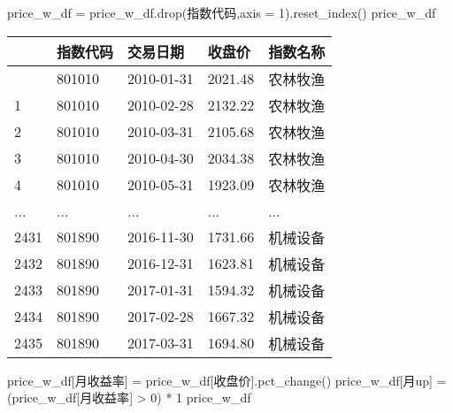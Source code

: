 \documentclass[
  letterpaper,
  DIV=11,
  numbers=noendperiod]{scrreprt}
\newenvironment{Shaded}{\begin{snugshade}}{\end{snugshade}}
\newcommand{\DecValTok}[1]{\textcolor[rgb]{0.68,0.00,0.00}{#1}}
\newcommand{\NormalTok}[1]{\textcolor[rgb]{0.00,0.23,0.31}{#1}}
\newcommand{\OperatorTok}[1]{\textcolor[rgb]{0.37,0.37,0.37}{#1}}
\newcommand{\StringTok}[1]{\textcolor[rgb]{0.13,0.47,0.30}{#1}}
\begin{document}
\begin{Shaded}
\begin{Highlighting}[]
\NormalTok{price\_w\_df }\OperatorTok{=}\NormalTok{ price\_w\_df.drop(}\StringTok{\textquotesingle{}指数代码\textquotesingle{}}\NormalTok{,axis }\OperatorTok{=} \DecValTok{1}\NormalTok{).reset\_index()}
\NormalTok{price\_w\_df}
\end{Highlighting}
\end{Shaded}

\begin{longtable}[]{@{}lllll@{}}
\toprule\noalign{}
& 指数代码 & 交易日期 & 收盘价 & 指数名称 \\
\midrule\noalign{}
\endhead
\bottomrule\noalign{}
\endlastfoot
0 & 801010 & 2010-01-31 & 2021.48 & 农林牧渔 \\
1 & 801010 & 2010-02-28 & 2132.22 & 农林牧渔 \\
2 & 801010 & 2010-03-31 & 2105.68 & 农林牧渔 \\
3 & 801010 & 2010-04-30 & 2034.38 & 农林牧渔 \\
4 & 801010 & 2010-05-31 & 1923.09 & 农林牧渔 \\
... & ... & ... & ... & ... \\
2431 & 801890 & 2016-11-30 & 1731.66 & 机械设备 \\
2432 & 801890 & 2016-12-31 & 1623.81 & 机械设备 \\
2433 & 801890 & 2017-01-31 & 1594.32 & 机械设备 \\
2434 & 801890 & 2017-02-28 & 1667.32 & 机械设备 \\
2435 & 801890 & 2017-03-31 & 1694.80 & 机械设备 \\
\end{longtable}

\begin{Shaded}
\begin{Highlighting}[]
\NormalTok{price\_w\_df[}\StringTok{\textquotesingle{}月收益率\textquotesingle{}}\NormalTok{] }\OperatorTok{=}\NormalTok{ price\_w\_df[}\StringTok{\textquotesingle{}收盘价\textquotesingle{}}\NormalTok{].pct\_change()}
\NormalTok{price\_w\_df[}\StringTok{\textquotesingle{}月up\textquotesingle{}}\NormalTok{]  }\OperatorTok{=}\NormalTok{  (price\_w\_df[}\StringTok{\textquotesingle{}月收益率\textquotesingle{}}\NormalTok{] }\OperatorTok{\textgreater{}} \DecValTok{0}\NormalTok{) }\OperatorTok{*} \DecValTok{1}
\NormalTok{price\_w\_df}
\end{Highlighting}
\end{Shaded}
\end{document}
